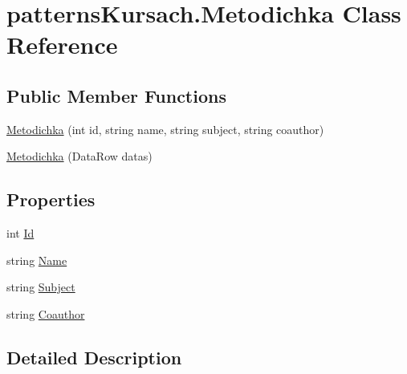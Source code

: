 \hypertarget{classpatterns_kursach_1_1_metodichka}{}\section{patterns\+Kursach.\+Metodichka Class Reference}
\label{classpatterns_kursach_1_1_metodichka}
\subsection*{Public Member Functions}
\begin{DoxyCompactItemize}
\item 
\mbox{\hyperlink{classpatterns_kursach_1_1_metodichka_ae38e404f5ac9b9bbbc015d4303616dbc}{Metodichka}} (int id, string name, string subject, string coauthor)
\item 
\mbox{\hyperlink{classpatterns_kursach_1_1_metodichka_a21bfce8717cc47d75b3b6a102cd2e076}{Metodichka}} (Data\+Row datas)
\end{DoxyCompactItemize}
\subsection*{Properties}
\begin{DoxyCompactItemize}
\item 
int \mbox{\hyperlink{classpatterns_kursach_1_1_metodichka_af1eef999fed5331bd81a0b45e5cbfc10}{Id}}
\item 
string \mbox{\hyperlink{classpatterns_kursach_1_1_metodichka_a5060cb3a5ac2c9ead4f076e7d7b1528a}{Name}}
\item 
string \mbox{\hyperlink{classpatterns_kursach_1_1_metodichka_a750ddc05459babd1b2a68a7c18358522}{Subject}}
\item 
string \mbox{\hyperlink{classpatterns_kursach_1_1_metodichka_a4f93600800bc458da0cb1b1b70d540d4}{Coauthor}}
\end{DoxyCompactItemize}


\subsection{Detailed Description}


